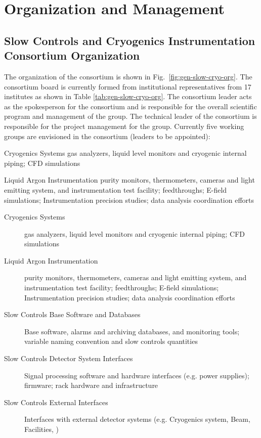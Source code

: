 \section{Organization and Management}
\label{sec:fdgen-slow-cryo-org}

\subsection{Slow Controls and Cryogenics Instrumentation Consortium Organization}
\label{sec:fdgen-slow-cryo-org-consortium}


The organization of the  consortium is shown in
Fig.\ \ref{fig:gen-slow-cryo-org}. The  consortium board is
currently formed from institutional representatives from 17 institutes
as shown in Table \ref{tab:gen-slow-cryo-org}. The consortium leader
acts as the spokesperson for the consortium and is responsible for the
overall scientific program and management of the group. The technical
leader of the consortium is responsible for the project management for
the group.  Currently five working groups are envisioned in the
consortium (leaders to be appointed):


Cryogenics Systems gas analyzers, liquid level monitors and cryogenic internal piping; CFD simulations

Liquid Argon Instrumentation purity monitors, thermometers, cameras and light emitting system, and instrumentation test facility; feedthroughs; E-field simulations; Instrumentation precision studies;  data analysis coordination efforts




\begin{description}
 \item[Cryogenics Systems] gas analyzers, liquid level
  monitors and cryogenic internal piping; CFD simulations
 \item[Liquid Argon Instrumentation] purity monitors, thermometers,
   cameras and light emitting system, and instrumentation test facility;
   feedthroughs; E-field simulations;
   Instrumentation precision studies;
    data analysis coordination efforts
 \item [Slow Controls Base Software and Databases]  Base software, alarms and archiving databases, and monitoring tools;
   variable naming convention and slow controls quantities
 \item [Slow Controls Detector System Interfaces] Signal processing software and hardware interfaces (e.g. power supplies);
   firmware; rack hardware and infrastructure   
 \item [Slow Controls External Interfaces] Interfaces with external detector systems (e.g. Cryogenics system, Beam, Facilities, )
\end{description}

